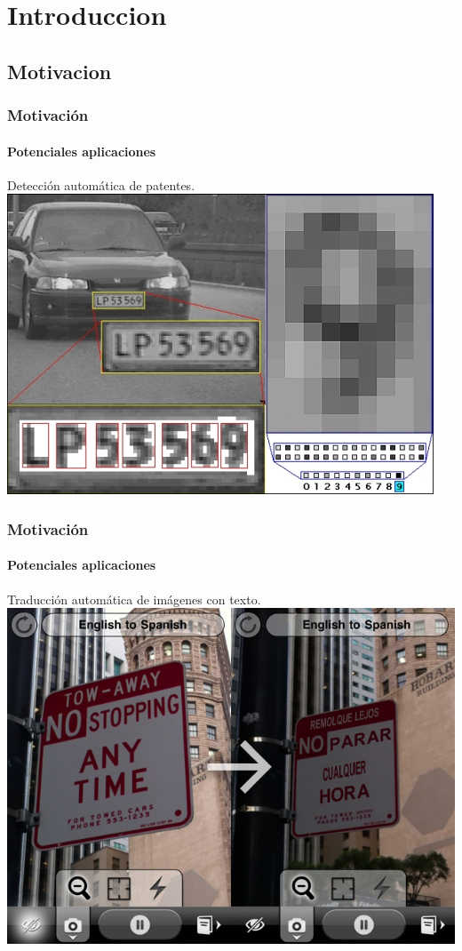 \section{Introduccion}
	\subsection{Motivacion}
	\begin{frame}
		\frametitle{Motivación}
		\framesubtitle{Potenciales aplicaciones}
		\begin{center}
			Detección automática de patentes.
			\includegraphics[height=0.65\paperheight]{imgs/alpr.jpg}			
		\end{center}
	\end{frame}
	\begin{frame}
		\frametitle{Motivación}
		\framesubtitle{Potenciales aplicaciones}
		\begin{center}
			Traducción automática de imágenes con texto.
			\includegraphics[height=0.65\paperheight]{imgs/wordlens.jpg}
		\end{center}
	\end{frame}
